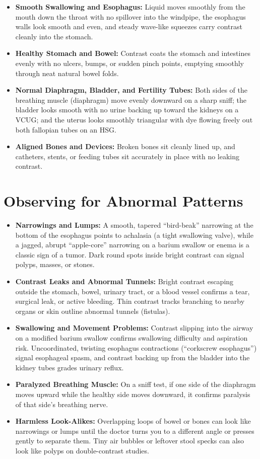 \begin{itemize}
    \item \textbf{Smooth Swallowing and Esophagus:} Liquid moves smoothly from the mouth down the throat with no spillover into the windpipe, the esophagus walls look smooth and even, and steady wave-like squeezes carry contrast cleanly into the stomach.
    \item \textbf{Healthy Stomach and Bowel:} Contrast coats the stomach and intestines evenly with no ulcers, bumps, or sudden pinch points, emptying smoothly through neat natural bowel folds.
    \item \textbf{Normal Diaphragm, Bladder, and Fertility Tubes:} Both sides of the breathing muscle (diaphragm) move evenly downward on a sharp sniff; the bladder looks smooth with no urine backing up toward the kidneys on a VCUG; and the uterus looks smoothly triangular with dye flowing freely out both fallopian tubes on an HSG.
    \item \textbf{Aligned Bones and Devices:} Broken bones sit cleanly lined up, and catheters, stents, or feeding tubes sit accurately in place with no leaking contrast.
\end{itemize}

\section{Observing for Abnormal Patterns}

\begin{itemize}
    \item \textbf{Narrowings and Lumps:} A smooth, tapered ``bird-beak'' narrowing at the bottom of the esophagus points to achalasia (a tight swallowing valve), while a jagged, abrupt ``apple-core'' narrowing on a barium swallow or enema is a classic sign of a tumor. Dark round spots inside bright contrast can signal polyps, masses, or stones.
    \item \textbf{Contrast Leaks and Abnormal Tunnels:} Bright contrast escaping outside the stomach, bowel, urinary tract, or a blood vessel confirms a tear, surgical leak, or active bleeding. Thin contrast tracks branching to nearby organs or skin outline abnormal tunnels (fistulas).
    \item \textbf{Swallowing and Movement Problems:} Contrast slipping into the airway on a modified barium swallow confirms swallowing difficulty and aspiration risk. Uncoordinated, twisting esophagus contractions (``corkscrew esophagus'') signal esophageal spasm, and contrast backing up from the bladder into the kidney tubes grades urinary reflux.
    \item \textbf{Paralyzed Breathing Muscle:} On a sniff test, if one side of the diaphragm moves upward while the healthy side moves downward, it confirms paralysis of that side's breathing nerve.
    \item \textbf{Harmless Look-Alikes:} Overlapping loops of bowel or bones can look like narrowings or lumps until the doctor turns you to a different angle or presses gently to separate them. Tiny air bubbles or leftover stool specks can also look like polyps on double-contrast studies.
\end{itemize}

